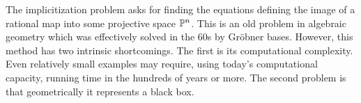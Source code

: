 \documentclass[fleqn,reqno]{amsart}
\numberwithin{first}{chapter}
\begin{document}

The implicitization problem asks for finding the equations defining the image of a rational map
into some projective space $\mathbb{P}^n$.
This is an old problem in algebraic geometry which was effectively solved in the 60s
by Gr\"obner bases.
However, this method has two intrinsic shortcomings.
The first is its computational complexity.
Even relatively small examples may require, using today's computational capacity,
running time in the hundreds of years or more.
The second problem is that geometrically it represents a black box.

\end{document}
